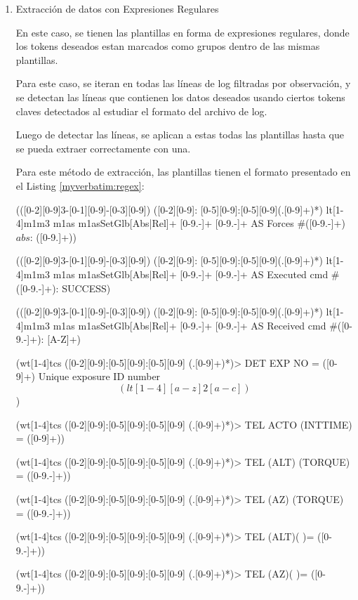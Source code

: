 \begin{enumerate}

    \item{Extracción de datos con Expresiones Regulares}
    
    En este caso, se tienen las plantillas en forma de expresiones regulares, donde los tokens deseados estan marcados como grupos dentro de las mismas plantillas.

    Para este caso, se iteran en todas las líneas de log filtradas por observación, y se detectan las líneas que contienen los datos deseados usando ciertos tokens claves detectados al estudiar el formato del archivo de log.

    Luego de detectar las líneas, se aplican a estas todas las plantillas hasta que se pueda extraer correctamente con una.

    Para este método de extracción, las plantillas tienen el formato presentado en el Listing \ref{myverbatim:regex}:

    \begin{myverbatim}[caption={Plantillas Regex},label={myverbatim:regex}]

(([0-2][0-9]{3}-[0-1][0-9]-[0-3][0-9]) ([0-2][0-9]:
[0-5][0-9]:[0-5][0-9](.[0-9]+)*) lt[1-4]m1m3 m1as 
m1asSetGlb[Abs|Rel]+ [0-9.-]+ [0-9.-]+ AS Forces 
#([0-9.-]+) \(abs\): ([0-9.\-\s]+))

(([0-2][0-9]{3}-[0-1][0-9]-[0-3][0-9]) ([0-2][0-9]:
[0-5][0-9]:[0-5][0-9](.[0-9]+)*) lt[1-4]m1m3 m1as 
m1asSetGlb[Abs|Rel]+ [0-9.-]+ [0-9.-]+ AS Executed 
cmd #([0-9.-]+): SUCCESS)

(([0-2][0-9]{3}-[0-1][0-9]-[0-3][0-9]) ([0-2][0-9]:
[0-5][0-9]:[0-5][0-9](.[0-9]+)*) lt[1-4]m1m3 m1as 
m1asSetGlb[Abs|Rel]+ [0-9.-]+ [0-9.-]+ AS Received 
cmd #([0-9.-]+): [A-Z]+)

(wt[1-4]tcs ([0-2][0-9]:[0-5][0-9]:[0-5][0-9]
(.[0-9]+)*)> DET EXP NO = ([0-9]+) \/ Unique exposure 
ID number \[(lt[1-4][a-z]{2}[a-c])\])

(wt[1-4]tcs ([0-2][0-9]:[0-5][0-9]:[0-5][0-9]
(.[0-9]+)*)> TEL ACTO (INTTIME) = ([0-9]+))

(wt[1-4]tcs ([0-2][0-9]:[0-5][0-9]:[0-5][0-9]
(.[0-9]+)*)> TEL (ALT) (TORQUE) = ([0-9.-]+))

(wt[1-4]tcs ([0-2][0-9]:[0-5][0-9]:[0-5][0-9]
(.[0-9]+)*)> TEL (AZ) (TORQUE) = ([0-9.-]+))

(wt[1-4]tcs ([0-2][0-9]:[0-5][0-9]:[0-5][0-9]
(.[0-9]+)*)> TEL (ALT)( )= ([0-9.-]+))

(wt[1-4]tcs ([0-2][0-9]:[0-5][0-9]:[0-5][0-9]
(.[0-9]+)*)> TEL (AZ)( )= ([0-9.-]+))


\end{myverbatim}
\end{enumerate}
